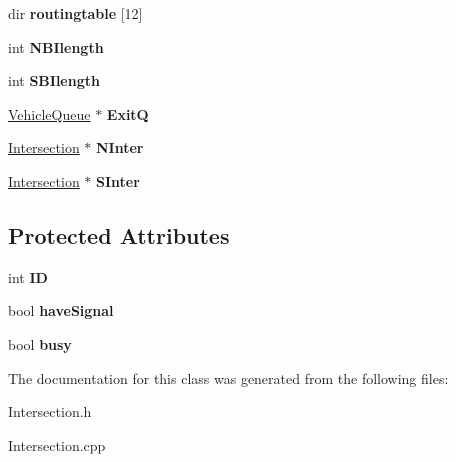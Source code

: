 \begin{DoxyCompactItemize}
\item 
\hypertarget{class_intersection_a87a7802a02ff65c92a6fd11c70144ca2}{dir {\bfseries routingtable} \mbox{[}12\mbox{]}}\label{class_intersection_a87a7802a02ff65c92a6fd11c70144ca2}

\item 
\hypertarget{class_intersection_a23e3dd72ef9a1e4fa82da6a503b61626}{int {\bfseries N\-B\-Ilength}}\label{class_intersection_a23e3dd72ef9a1e4fa82da6a503b61626}

\item 
\hypertarget{class_intersection_a11b364d7355af20e013e2217596588ec}{int {\bfseries S\-B\-Ilength}}\label{class_intersection_a11b364d7355af20e013e2217596588ec}

\item 
\hypertarget{class_intersection_a2456746faabd194633c2b133440449c6}{\hyperlink{class_vehicle_queue}{Vehicle\-Queue} $\ast$ {\bfseries Exit\-Q}}\label{class_intersection_a2456746faabd194633c2b133440449c6}

\item 
\hypertarget{class_intersection_a577edea4aa08d05052e6cbf7aa2ba9e2}{\hyperlink{class_intersection}{Intersection} $\ast$ {\bfseries N\-Inter}}\label{class_intersection_a577edea4aa08d05052e6cbf7aa2ba9e2}

\item 
\hypertarget{class_intersection_af6cfb23dbc2ad5b1d90752247dd07acf}{\hyperlink{class_intersection}{Intersection} $\ast$ {\bfseries S\-Inter}}\label{class_intersection_af6cfb23dbc2ad5b1d90752247dd07acf}

\end{DoxyCompactItemize}
\subsection*{Protected Attributes}
\begin{DoxyCompactItemize}
\item 
\hypertarget{class_intersection_aec0f4beb4f24b87b7f47aa6e23b7f4dd}{int {\bfseries I\-D}}\label{class_intersection_aec0f4beb4f24b87b7f47aa6e23b7f4dd}

\item 
\hypertarget{class_intersection_a6c8f8ad77cc05de03282b613001a5729}{bool {\bfseries have\-Signal}}\label{class_intersection_a6c8f8ad77cc05de03282b613001a5729}

\item 
\hypertarget{class_intersection_ac7c8fd3e12e9df00670ae7c0f77d1e17}{bool {\bfseries busy}}\label{class_intersection_ac7c8fd3e12e9df00670ae7c0f77d1e17}

\end{DoxyCompactItemize}


The documentation for this class was generated from the following files\-:\begin{DoxyCompactItemize}
\item 
Intersection.\-h\item 
Intersection.\-cpp\end{DoxyCompactItemize}
